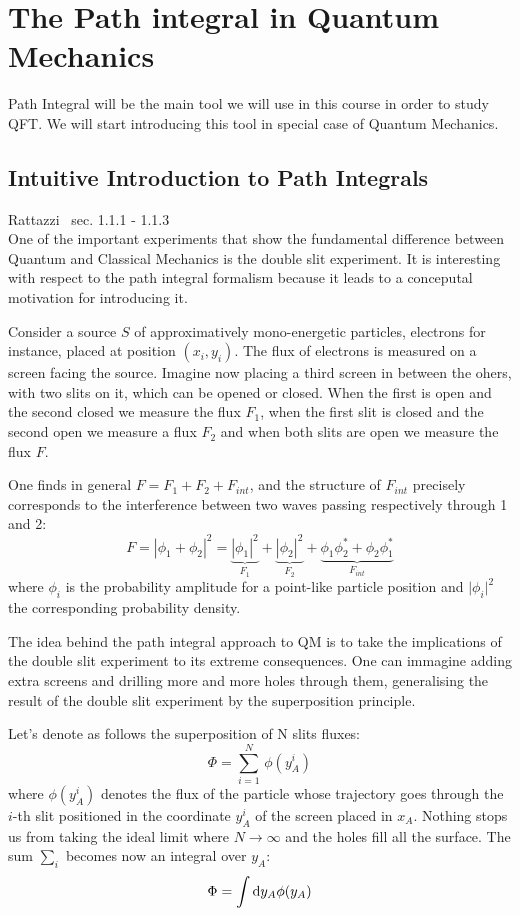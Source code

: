 \documentclass[../main/main.tex]{subfiles}
\begin{document}
\chapter{The Path integral in Quantum Mechanics}

Path Integral will be the main tool we will use in this course in order to study QFT.
We will start introducing this tool in special case of Quantum Mechanics.

\section{Intuitive Introduction to Path Integrals}
\textsf{Rattazzi~\cite{Rattazzi:2011aa} sec. 1.1.1 - 1.1.3}\\

One of the important experiments that show the fundamental difference between Quantum and Classical Mechanics is the double slit experiment. It is interesting with respect to the path integral formalism because it leads to a conceputal motivation for introducing it.

Consider a source $S$ of approximatively mono-energetic particles, electrons for instance, placed at position $(x_i,y_i)$. The flux of electrons is measured on a screen facing the source. Imagine now placing a third screen in between the ohers, with two slits on it, which can be opened or closed. When the first is open and the second closed we measure the flux $F_1$, when the first slit is closed and the second open we measure a flux $F_2$ and when both slits are open we measure the flux $F$.

One finds in general $F=F_1+F_2+F_{int}$, and the structure of $F_{int}$ precisely corresponds to the interference between two waves passing respectively through 1 and 2:
\[F=|\phi_1+\phi_2|^2=\underbrace{|\phi_1|^2}_{F_1}+\underbrace{|\phi_2|^2}_{F_2}+\underbrace{\phi_1\phi_2^*+\phi_2\phi_1^*}_{F_{int}}\]
where $\phi_i$ is the probability amplitude for a point-like particle position and $\vert\phi_i\vert^2$ the corresponding probability density.

The idea behind the path integral approach to QM is to take the implications of the double slit experiment to its extreme consequences. One can immagine adding extra screens and drilling more and more holes through them, generalising the result of the double slit experiment by the superposition principle.

Let's denote as follows the superposition of N slits fluxes:
\[\Phi={\sum_{i=1}^N}\,\phi(y^i_A)\]
where $\phi(y^i_A)$ denotes the flux of the particle whose trajectory goes through the $i$-th slit positioned in the coordinate $y^i_A$ of the screen placed in $x_A$.
Nothing stops us from taking the ideal limit where $N\to\infty$ and the holes fill all the surface. The sum $\sum_i$ becomes now an integral over $y_A$:
\[\Phi=\int\textup{d} y_A\phi(y_A)\]
\end{document}
